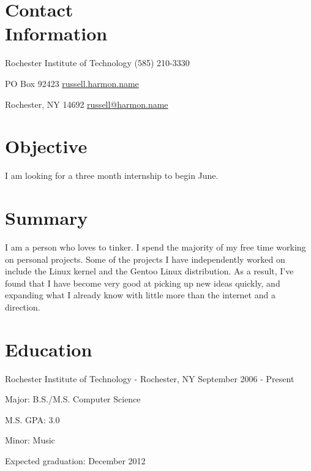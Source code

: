 \documentclass[a4paper,margin,line]{resume}
\newcommand{\rdate}[1]{\hfill {\small #1}}
\begin{document}
\begin{resume}
\section{\mysidestyle Contact \\ Information} \vspace{2mm}
	\begin{asparablank}
		\item Rochester Institute of Technology \hfill (585) 210-3330
		\item PO Box 92423 \hfill \href{http://russell.harmon.name/}{russell.harmon.name}
		\item Rochester, NY 14692 \hfill \href{mailto:russell@harmon.name}{russell@harmon.name}
	\end{asparablank}

\section{\mysidestyle Objective}
	I am looking for a three month internship to begin June.

\section{\mysidestyle Summary}
	I am a person who loves to tinker. I spend the majority of my free time working on personal projects. Some of the projects I have independently worked on include the Linux kernel and the Gentoo Linux distribution.  As a result, I've found that I have become very good at picking up new ideas quickly, and expanding what I already know with little more than the internet and a direction.

\section{\mysidestyle Education}
	\begin{compactdesc}
		\item[Rochester Institute of Technology] - Rochester, NY \rdate{September 2006 - Present}
		\begin{compactitem} { \small
			\item Major: B.S./M.S. Computer Science
			\item M.S. GPA: 3.0
			\item Minor: Music
			\item Expected graduation: December 2012
		} \end{compactitem}
	\end{compactdesc}


\end{resume}
\end{document}
